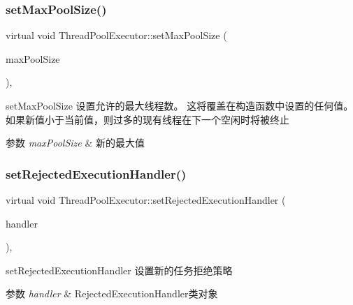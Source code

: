 \subsubsection{\texorpdfstring{set\+Max\+Pool\+Size()}{setMaxPoolSize()}}
{\footnotesize\ttfamily virtual void Thread\+Pool\+Executor\+::set\+Max\+Pool\+Size (\begin{DoxyParamCaption}\item[{int}]{max\+Pool\+Size }\end{DoxyParamCaption})\hspace{0.3cm}{\ttfamily [final]}, {\ttfamily [virtual]}}



set\+Max\+Pool\+Size 设置允许的最大线程数。 这将覆盖在构造函数中设置的任何值。 如果新值小于当前值，则过多的现有线程在下一个空闲时将被终止 


\begin{DoxyParams}{参数}
{\em max\+Pool\+Size} & 新的最大值 \\
\hline
\end{DoxyParams}
\mbox{\label{classThreadPoolExecutor_a0a471dc0a68b70d99d8215565a4df688}} 
\subsubsection{\texorpdfstring{set\+Rejected\+Execution\+Handler()}{setRejectedExecutionHandler()}}
{\footnotesize\ttfamily virtual void Thread\+Pool\+Executor\+::set\+Rejected\+Execution\+Handler (\begin{DoxyParamCaption}\item[{\hyperlink{classRejectedExecutionHandler}{Rejected\+Execution\+Handler}}]{handler }\end{DoxyParamCaption})\hspace{0.3cm}{\ttfamily [final]}, {\ttfamily [virtual]}}



set\+Rejected\+Execution\+Handler 设置新的任务拒绝策略 


\begin{DoxyParams}{参数}
{\em handler} & Rejected\+Execution\+Handler类对象 \\
\hline
\end{DoxyParams}
\mbox{\label{classThreadPoolExecutor_a94834ab6bedcc75111524fec4e928b3f}} 
